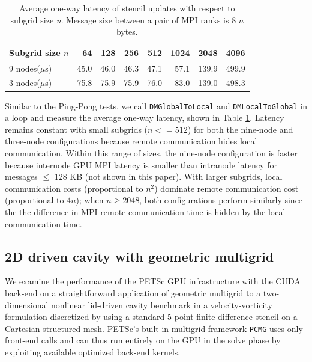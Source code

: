 \documentclass[10pt,journal,compsoc]{IEEEtran}
\begin{document}
\begin{table}[ht]
\small
\setlength\tabcolsep{4.5pt}
\caption{Average one-way latency of stencil updates with respect to subgrid size \textit{n}. Message 
size 
between a pair of MPI ranks is 
8 $n$ bytes.}
\begin{tabular}{|l|r|r|r|r|r|r|r|}
\hline
Subgrid size $n$       & 64   & 128  & 256  & 512  & 1024 & 2048  & 4096 \\ \hline
9  nodes($\mu$s)    & 45.0 & 46.0 & 46.3 & 47.1 & 57.1 & 139.9 & 499.9 \\ \hline
3  nodes($\mu$s)    & 75.8 & 75.9 & 75.9 & 76.0 & 83.0 & 139.0 & 498.3 \\ \hline
\end{tabular}
\label{tab:sfdmda}
\end{table}

Similar to the Ping-Pong tests, we call
\texttt{DMGlobalToLocal} and \texttt{DMLocalToGlobal} in a loop and measure the
average one-way latency, shown in Table \ref{tab:sfdmda}.
Latency remains constant with
small subgrids ($n<=512$) for both the nine-node and three-node configurations
because remote communication hides local communication.
Within this range of sizes, the nine-node configuration is faster because
internode GPU MPI latency is smaller than intranode latency for messages $\leq$ 128 KB
(not shown in this paper). With larger subgrids, local communication
costs (proportional to $n^2$) dominate remote
communication cost (proportional to $4n$); when 
$n \ge 2048$, both configurations perform similarly since the
the difference in MPI remote communication time is hidden by the local
communication time.



\subsection{2D driven cavity with geometric multigrid}
\label{subsec:multigrid}

We examine the performance of the PETSc GPU infrastructure
with the CUDA back-end
on a straightforward application of geometric multigrid to a
two-dimensional nonlinear lid-driven cavity benchmark in a velocity-vorticity formulation discretized by using a standard 5-point finite-difference stencil on a Cartesian structured mesh.
PETSc's built-in multigrid framework {\tt PCMG} uses only front-end calls and can thus run entirely on the GPU
in the solve phase by exploiting available optimized back-end kernels.
\end{document}
